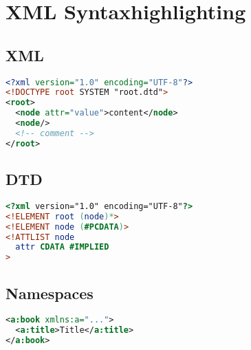 \documentclass[11pt]{article}
\begin{document}
\section*{XML Syntaxhighlighting}

\subsection*{XML}

\begin{lstlisting}[language=XML]
<?xml version="1.0" encoding="UTF-8"?>
<!DOCTYPE root SYSTEM "root.dtd">
<root>
  <node attr="value">content</node>
  <node/>
  <!-- comment -->
</root>
\end{lstlisting}

\subsection*{DTD}

\begin{lstlisting}[language=DTD]
<?xml version="1.0" encoding="UTF-8"?>
<!ELEMENT root (node)*>
<!ELEMENT node (#PCDATA)>
<!ATTLIST node
  attr CDATA #IMPLIED
>
\end{lstlisting}

\subsection*{Namespaces}

\begin{lstlisting}[language=XML]
<a:book xmlns:a="...">
  <a:title>Title</a:title>
</a:book>
\end{lstlisting}
\end{document}
